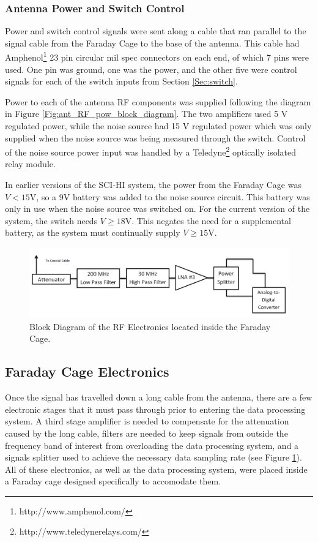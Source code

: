 \subsubsection{Antenna Power and Switch Control} \label{Sec:ant_pow}
Power and switch control signals were sent along a cable that ran parallel to the signal cable from the Faraday Cage to the base of the antenna. This cable had Amphenol\footnote{http://www.amphenol.com/} 23 pin circular mil spec connectors on each end, of which 7 pins were used. One pin was ground, one was the power, and the other five were control signals for each of the switch inputs from Section \ref{Sec:switch}. 

Power to each of the antenna RF components was supplied following the diagram in Figure \ref{Fig:ant_RF_pow_block_diagram}. The two amplifiers used 5 V regulated power, while the noise source had 15 V regulated power which was only supplied when the noise source was being measured through the switch. Control of the noise source power input was handled by a Teledyne\footnote{http://www.teledynerelays.com/} optically isolated relay module. 

In earlier versions of the SCI-HI system, the power from the Faraday Cage was $V< 15$V, so a 9V battery was added to the noise source circuit. This battery was only in use when the noise source was switched on. For the current version of the system, the switch needs $V \geq 18$V. This negates the need for a supplemental battery, as the system must continually supply $V \geq 15$V.  

\begin{figure}[htb]
\begin{center}
\includegraphics[width=0.9\linewidth]{SCIHI_system/figures/faraday_cage_rf_block_diagram.png}
\caption{Block Diagram of the RF Electronics located inside the Faraday Cage.}
\label{Fig:fcage_RF_block_diagram}
\end{center}
\end{figure}

\subsection{Faraday Cage Electronics}
Once the signal has travelled down a long cable from the antenna, there are a few electronic stages that it must pass through prior to entering the data processing system. A third stage amplifier is needed to compensate for the attenuation caused by the long cable, filters are needed to keep signals from outside the frequency band of interest from overloading the data processing system, and a signals splitter used to achieve the necessary data sampling rate (see Figure \ref{Fig:fcage_RF_block_diagram}). All of these electronics, as well as the data processing system, were placed inside a Faraday cage designed specifically to accomodate them. 


